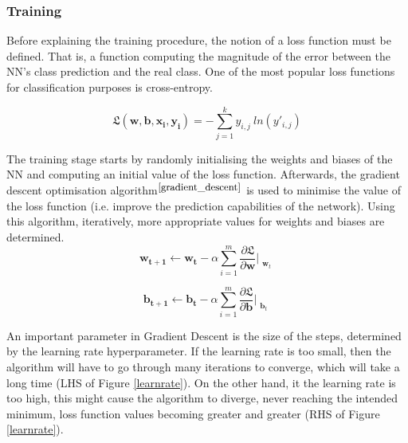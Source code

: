 \subsubsection*{Training}

Before explaining the training procedure, the notion of a loss function must be defined. That is, a function computing the magnitude of the error between the NN's class prediction and the real class. One of the most popular loss functions for classification purposes is cross-entropy.

\begin{equation}
  \mathbf{\mathfrak{L}}(\mathbf{w}, \mathbf{b}, \mathbf{x_i}, \mathbf{y_i}) = - \sum_{j=1}^k y_{i,j} \ ln(y'_{i,j})
\end{equation}

The training stage starts by randomly initialising the weights and biases of the NN and computing an initial value of the loss function. Afterwards, the gradient descent optimisation algorithm$^{\small \cite{gradient_descent}}$ is used to minimise the value of the loss function (i.e. improve the prediction capabilities of the network). Using this algorithm, iteratively, more appropriate values for weights and biases are determined. \\

\begin{equation}
  \mathbf{w_{t+1}} \leftarrow \mathbf{w_t} - \alpha \sum_{i=1}^m \frac{\partial \mathfrak{L}}{\partial \mathbf{w}}\Bigr|_{\substack{\mathbf{w}_t}}
\end{equation}

\begin{equation}
  \mathbf{b_{t+1}} \leftarrow \mathbf{b_t} - \alpha \sum_{i=1}^m \frac{\partial \mathfrak{L}}{\partial \mathbf{b}}\Bigr|_{\substack{\mathbf{b}_t}}
\end{equation}

\bigskip

An important parameter in Gradient Descent is the size of the steps, determined by the learning rate hyperparameter. If the learning rate is too small, then the algorithm will have to go through many iterations to converge, which will take a long time (LHS of Figure \ref{learnrate}). On the other hand, it the learning rate is too high, this might cause the algorithm to diverge, never reaching the intended minimum, loss function values becoming greater and greater (RHS of Figure \ref{learnrate}). \\


